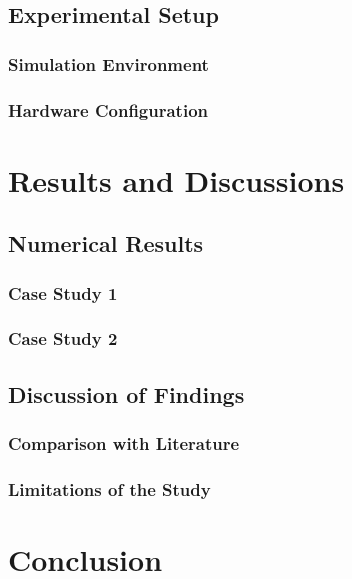 \subsection{Experimental Setup}
\subsubsection{Simulation Environment}
\subsubsection{Hardware Configuration}

\section{Results and Discussions}
\lipsum[1]
\subsection{Numerical Results}
\lipsum[1]
\subsubsection{Case Study 1}
\lipsum[1]
\subsubsection{Case Study 2}
\lipsum[1]

\subsection{Discussion of Findings}
\lipsum[1]
\subsubsection{Comparison with Literature}
\lipsum[1]
\subsubsection{Limitations of the Study}
\lipsum[1]

\section{Conclusion }
\lipsum[1-3]